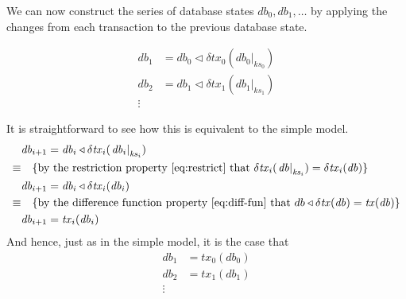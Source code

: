 \documentclass[11pt,a4paper]{article}
\newcommand\restrict[2]{\left.#1\right|_{#2}}
\begin{document}
We can now construct the series of database states
$\mathit{db}_0, \mathit{db}_1, \ldots$
by applying the changes from each transaction to the previous database state.

\begin{center}
\begin{align*}
 \mathit{db}_1 & = \mathit{db}_0 \triangleleft \delta\mathit{tx}_0(\restrict{\mathit{db}_0}{\mathit{ks}_0}) \\
 \mathit{db}_2 & = \mathit{db}_1 \triangleleft \delta\mathit{tx}_1(\restrict{\mathit{db}_1}{\mathit{ks}_1}) \\
 \vdots
\end{align*}
\end{center}
It is straightforward to see how this is equivalent to the simple model.
\begin{align*}
       & \mathit{db}_{i+1} = \mathit{db}_i \triangleleft \delta\mathit{tx}_i(\restrict{\mathit{db}_i}{\mathit{ks}_i}) \\
\equiv & \quad \text{\{by the restriction property \cref{eq:restrict} that
                     $\delta\mathit{tx}_i(\restrict{\mathit{db}}{\mathit{ks}_i}) = \delta\mathit{tx}_i(\mathit{db})$\}} \\
       & \mathit{db}_{i+1} = \mathit{db}_i \triangleleft \delta\mathit{tx}_i(\mathit{db}_i) \\
\equiv & \quad \text{\{by the difference function property \cref{eq:diff-fun} that
                     $db \triangleleft \delta\mathit{tx}(\mathit{db}) = \mathit{tx}(\mathit{db})$\}} \\
       & \mathit{db}_{i+1} = \mathit{tx}_i(\mathit{db}_i)
\end{align*}
And hence, just as in the simple model, it is the case that
\begin{align*}
 \mathit{db}_1 & = \mathit{tx}_0(\mathit{db}_0) \\
 \mathit{db}_2 & = \mathit{tx}_1(\mathit{db}_1) \\
 \vdots
\end{align*}
\end{document}
